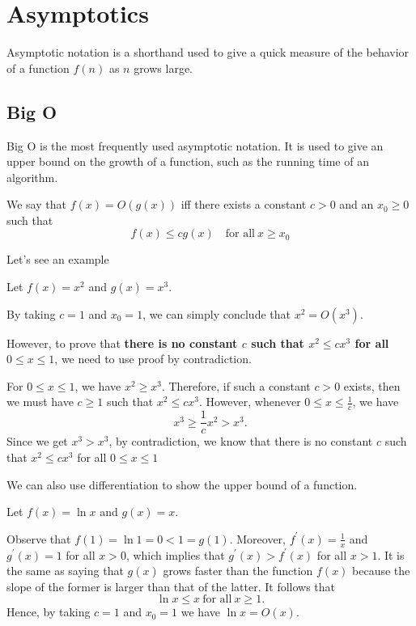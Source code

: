 \chapter{Asymptotics}

Asymptotic notation is a shorthand used to give a quick measure of the behavior of a function \(f(n)\) as \(n\) grows large. 

\section{Big O}
Big O is the most frequently used asymptotic notation. It is used to give an upper bound on the growth of a function, such as the running time of an algorithm.

\begin{definition}
    We say that \(f(x) = O(g(x))\) iff there exists a constant \(c > 0\) and an \(x_0 \geq 0\) such that
    \[
    f(x) \leq cg(x)\quad\text{for all}\ x \geq x_0
    \]
\end{definition}

Let's see an example
\begin{eg}
    Let \(f(x) = x^2\) and \(g(x) = x^3\). 

    By taking \(c = 1\) and \(x_0 = 1\), we can simply conclude that \(x^2 = O(x^3)\). 
    
    However, to prove that \textbf{there is no constant \(c\) such that \(x^2 \leq cx^3\) for all \(0 \leq x \leq 1\)}, we need to use proof by contradiction. 
    
    For \(0 \leq x \leq 1\), we have \(x^2 \geq x^3\). Therefore, if such a constant \(c > 0\) exists, then we must have \(c \geq 1\) such that \(x^2 \leq cx^3\). However, whenever \(0 \leq x \leq \frac{1}{c}\), we have
    \[
        x^3 \geq \dfrac{1}{c}x^2 > x^3.
    \]
    Since we get \(x^3 > x^3\), by contradiction, we know that there is no constant \(c\) such that \(x^2 \leq cx^3\) for all \(0 \leq x \leq 1\)
\end{eg}

We can also use differentiation to show the upper bound of a function.
\begin{eg}
Let \(f(x) = \ln x\) and \(g(x) = x\). 

Observe that \(f(1) = \ln 1 = 0 < 1 = g(1)\).  Moreover, \(f^{\prime} (x) = \frac{1}{x}\) and \(g^{\prime} (x) = 1\) for all \(x > 0\), which implies that \(g^{\prime}(x) > f^{\prime}(x)\) for all \(x > 1\). It is the same as saying that \(g(x)\) grows faster than the function \(f(x)\) because the slope of the former is larger than that of the latter. It follows that
\[
    \ln x \leq x\ \text{for all}\ x \geq 1.
\] 
Hence, by taking \(c = 1\) and \(x_0 = 1\) we have \(\ln x = O(x).\) 
\end{eg}

